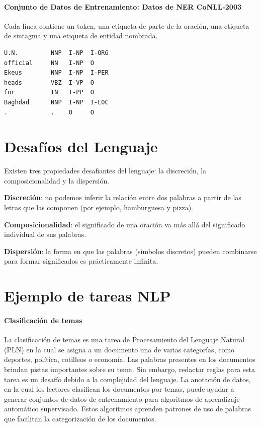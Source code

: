 \documentclass{book}
\begin{document}
\paragraph{Conjunto de Datos de Entrenamiento: Datos de NER CoNLL-2003}

Cada línea contiene un token, una etiqueta de parte de la oración, una etiqueta de sintagma y una etiqueta de entidad nombrada.
\begin{center}
\begin{verbatim}
U.N.         NNP  I-NP  I-ORG
official     NN   I-NP  O
Ekeus        NNP  I-NP  I-PER
heads        VBZ  I-VP  O
for          IN   I-PP  O
Baghdad      NNP  I-NP  I-LOC
.            .    O     O
\end{verbatim}
\end{center}


\section{Desafíos del Lenguaje}

Existen tres propiedades desafiantes del lenguaje: la discreción, la composicionalidad y la dispersión.

\textbf{Discreción}: no podemos inferir la relación entre dos palabras a partir de las letras que las componen (por ejemplo, hamburguesa y pizza).

\textbf{Composicionalidad}: el significado de una oración va más allá del significado individual de sus palabras.

\textbf{Dispersión}: la forma en que las palabras (símbolos discretos) pueden combinarse para formar significados es prácticamente infinita.



\section{Ejemplo de tareas NLP}


\paragraph{Clasificación de temas}

La clasificación de temas es una tarea de Procesamiento del Lenguaje Natural (PLN) en la cual se asigna a un documento una de varias categorías, como deportes, política, cotilleos o economía. Las palabras presentes en los documentos brindan pistas importantes sobre su tema. Sin embargo, redactar reglas para esta tarea es un desafío debido a la complejidad del lenguaje. La anotación de datos, en la cual los lectores clasifican los documentos por temas, puede ayudar a generar conjuntos de datos de entrenamiento para algoritmos de aprendizaje automático supervisado. Estos algoritmos aprenden patrones de uso de palabras que facilitan la categorización de los documentos.
\end{document}
